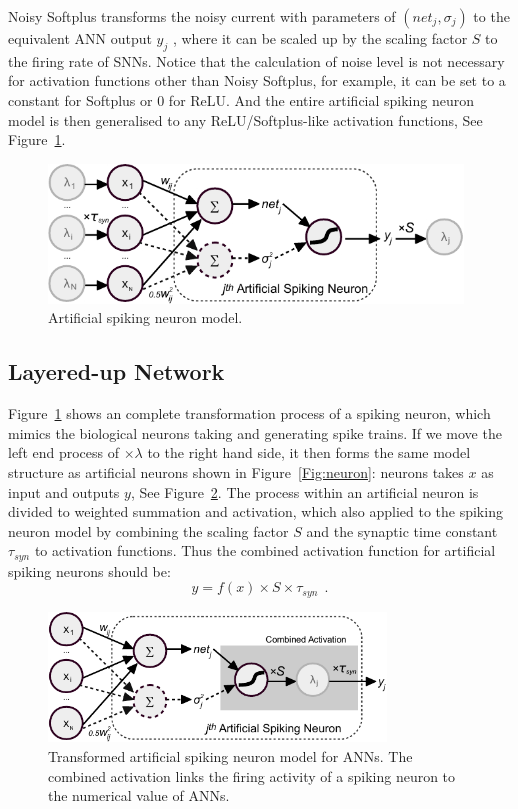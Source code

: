 	
	Noisy Softplus transforms the noisy current with parameters of $(net_j, \sigma_j)$ to the equivalent ANN output $y_j$ , where it can be scaled up by the scaling factor $S$ to the firing rate of SNNs.
	Notice that the calculation of noise level is not necessary for activation functions other than Noisy Softplus, for example, it can be set to a constant for Softplus or 0 for ReLU.
	And the entire artificial spiking neuron model is then generalised to any ReLU/Softplus-like activation functions, See Figure~\ref{Fig:sneuron}.
	
	\begin{figure}[bt]
		\centering
		\includegraphics[width=0.98\textwidth]{pics_sdlm/neuron_o.pdf}
		\caption{Artificial spiking neuron model. }
		\label{Fig:sneuron}
	\end{figure}
	
	
	\subsection{Layered-up Network}
	
	Figure~\ref{Fig:sneuron} shows an complete transformation process of a spiking neuron, which mimics the biological neurons taking and generating spike trains.
	If we move the left end process of $\times \lambda$ to the right hand side, it then forms the same model structure as artificial neurons shown in Figure~\ref{Fig:neuron}: neurons takes $x$ as input and outputs $y$, See Figure~\ref{Fig:tneuron}.
	The process within an artificial neuron is divided to weighted summation and activation, which also applied to the spiking neuron model by combining the scaling factor $S$ and the synaptic time constant $\tau_{syn}$ to activation functions.
	Thus the combined activation function for artificial spiking neurons should be:
	\begin{equation}
	y = f(x) \times S \times \tau_{syn}~~.
	\label{equ:full_act}
	\end{equation}
	\begin{figure}[tbh!]
		\centering
		\includegraphics[width=0.8\textwidth]{pics_sdlm/neuron_t.pdf}
		\caption{Transformed artificial spiking neuron model for ANNs. The combined activation links the firing activity of a spiking neuron to the numerical value of ANNs.}
		\label{Fig:tneuron}
	\end{figure}
	

